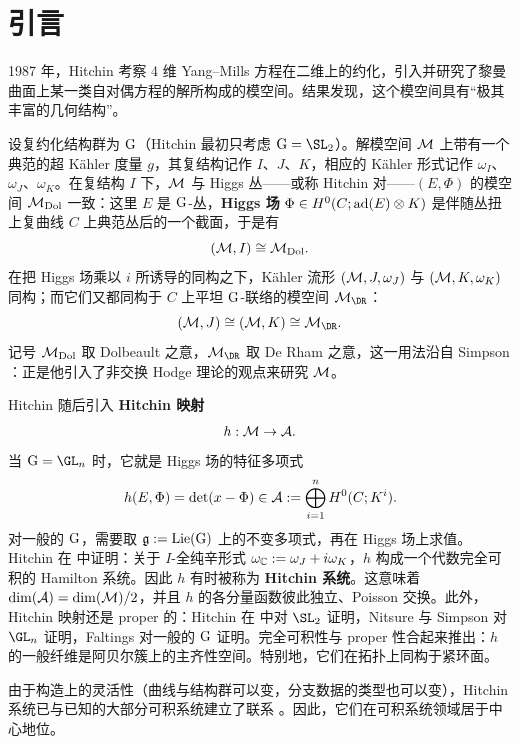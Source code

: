 
\section{引言}

1987 年，Hitchin \cite{hitchin} 考察 4 维 Yang--Mills 方程在二维上的约化，引入并研究了黎曼曲面上某一类自对偶方程的解所构成的模空间。结果发现，这个模空间具有“极其丰富的几何结构”。

设复约化结构群为 $\mathrm{G}$（Hitchin 最初只考虑 $\G=\SL_2$）。解模空间 ${\mathcal{M}}$ 上带有一个典范的超 Kähler 度量 $g$，其复结构记作 $I$、$J$、$K$，相应的 Kähler 形式记作 $\omega_I$、$\omega_J$、$\omega_K$。在复结构 $I$ 下，${\mathcal{M}}$ 与 Higgs 丛——或称 Hitchin 对——$(E,\Phi)$ 的模空间 ${\mathcal{M}}_{\mathrm{Dol}}$ 一致：这里 $E$ 是 $\mathrm{G}$-丛，\textbf{Higgs 场} $\Phi\in H^0(C;\textnormal{ad}(E)\otimes K)$ 是伴随丛扭上复曲线 $C$ 上典范丛后的一个截面，于是有
\[
({\mathcal{M}},I)\cong {\mathcal{M}}_{{\mathrm{Dol}}}.
\]
在把 Higgs 场乘以 $i$ 所诱导的同构之下，Kähler 流形 $({\mathcal{M}},J,\omega_J)$ 与 $({\mathcal{M}},K,\omega_K)$ 同构；而它们又都同构于 $C$ 上平坦 $\mathrm{G}$-联络的模空间 $\M_\DR$：
\begin{equation}\label{JK}
(\M,J)\cong (\M,K)\cong \M_{\DR}.
\end{equation}
记号 ${\mathcal{M}}_{\mathrm{Dol}}$ 取 Dolbeault 之意，$\M_\DR$ 取 De Rham 之意，这一用法沿自 Simpson \cite{simpson}：正是他引入了非交换 Hodge 理论的观点来研究 ${\mathcal{M}}$。

Hitchin \cite{hitchin-stable} 随后引入 \textbf{Hitchin 映射}
\[
h:{\mathcal{M}}\to {\mathcal A}.
\]
当 $\G=\GL_n$ 时，它就是 Higgs 场的特征多项式
\[
h(E,\Phi)=\det(x-\Phi)\in {\mathcal{A}}:=\bigoplus_{i=1}^n H^0(C;K^i).
\]
对一般的 $\mathrm{G}$，需要取 ${\frak g}:=\mathrm{Lie}(\mathrm{G})$ 上的不变多项式，再在 Higgs 场上求值。Hitchin 在 \cite{hitchin-stable} 中证明：关于 $I$-全纯辛形式 $\omega_{\mathbb{C}}:=\omega_J+i\omega_K$，$h$ 构成一个代数完全可积的 Hamilton 系统。因此 $h$ 有时被称为 \textbf{Hitchin 系统}。这意味着 $\dim({\mathcal A})=\dim({\mathcal{M}})/2$，并且 $h$ 的各分量函数彼此独立、Poisson 交换。此外，Hitchin 映射还是 proper 的：Hitchin 在 \cite{hitchin-stable} 中对 $\SL_2$ 证明，Nitsure \cite{nitsure} 与 Simpson \cite{simpson} 对 $\GL_n$ 证明，Faltings \cite{faltings} 对一般的 $\mathrm{G}$ 证明。完全可积性与 proper 性合起来推出：$h$ 的一般纤维是阿贝尔簇上的主齐性空间。特别地，它们在拓扑上同构于紧环面。

由于构造上的灵活性（曲线与结构群可以变，分支数据的类型也可以变），Hitchin 系统已与已知的大部分可积系统建立了联系 \cite{donagi-markman,donagi}。因此，它们在可积系统领域居于中心地位。

